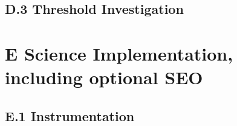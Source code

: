 \documentclass[12pt,journal]{IEEEtran}
\begin{document}
\subsection{D.3 Threshold Investigation}

\section{E	Science Implementation, including optional SEO}%
\par{}%

\subsection{E.1	Instrumentation}
\end{document}
